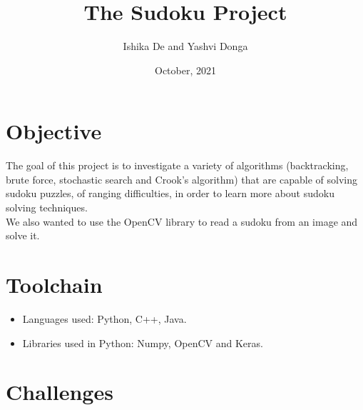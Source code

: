 \documentclass[12pt]{article}
\title {\textbf{The Sudoku Project}}
\author{Ishika De and Yashvi Donga}
\date{October, 2021}
\begin{document}
    \maketitle
    \section{Objective}
    The goal of this project is to investigate a variety of algorithms
    (backtracking, brute force, stochastic search and Crook’s algorithm) that
    are capable of solving sudoku puzzles, of ranging difficulties, in order to
    learn more about sudoku solving techniques.\\
    We also wanted to use the OpenCV library to read a sudoku from an
    image and solve it.
    \section{Toolchain}
    \begin{itemize}
        \item Languages used: Python, C++, Java.
        \item Libraries used in Python: Numpy, OpenCV and Keras.
    \end{itemize}
    \section{Challenges}
\end{document}
